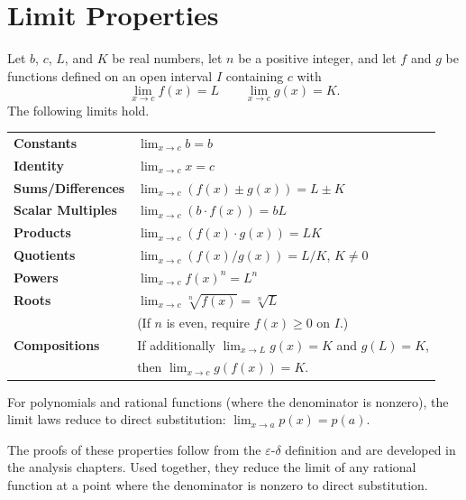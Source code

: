 \section{Limit Properties}

\begin{tcolorbox}[colback=thmbox, colframe=thmborder, arc=2pt,
  left=6pt, right=6pt, top=4pt, bottom=4pt,
  title={\small\textbf{Theorem (Basic Limit Properties)}},
  fonttitle=\small\bfseries]
Let $b$, $c$, $L$, and $K$ be real numbers, let $n$ be a positive
integer, and let $f$ and $g$ be functions defined on an open interval
$I$ containing $c$ with
\[
  \lim_{x \to c} f(x) = L \qquad \lim_{x \to c} g(x) = K.
\]
The following limits hold.

\medskip
\begin{tabular}{@{}p{}p{}@{}}
\textbf{Constants}        & $\displaystyle\lim_{x \to c} b = b$ \\[10pt]
\textbf{Identity}         & $\displaystyle\lim_{x \to c} x = c$ \\[10pt]
\textbf{Sums/Differences} & $\displaystyle\lim_{x \to c}(f(x) \pm g(x)) = L \pm K$ \\[10pt]
\textbf{Scalar Multiples} & $\displaystyle\lim_{x \to c}(b \cdot f(x)) = bL$ \\[10pt]
\textbf{Products}         & $\displaystyle\lim_{x \to c}(f(x) \cdot g(x)) = LK$ \\[10pt]
\textbf{Quotients}        & $\displaystyle\lim_{x \to c}(f(x)/g(x)) = L/K$, \quad $K \neq 0$ \\[10pt]
\textbf{Powers}           & $\displaystyle\lim_{x \to c} f(x)^n = L^n$ \\[10pt]
\textbf{Roots}            & $\displaystyle\lim_{x \to c} \sqrt[n]{f(x)} = \sqrt[n]{L}$ \\[4pt]
                          & (If $n$ is even, require $f(x) \geq 0$ on $I$.) \\[10pt]
\textbf{Compositions}     & If additionally $\displaystyle\lim_{x \to L} g(x) = K$ and $g(L) = K$, \\[6pt]
                          & then $\displaystyle\lim_{x \to c} g(f(x)) = K$. \\
\end{tabular}
\end{tcolorbox}

\begin{remark*}
For polynomials and rational functions (where the denominator is nonzero),
the limit laws reduce to direct substitution: $\lim_{x \to a} p(x) = p(a)$.
\end{remark*}

\begin{remark*}
The proofs of these properties follow from the $\varepsilon$-$\delta$
definition and are developed in the analysis chapters.
Used together, they reduce the limit of any rational function at a
point where the denominator is nonzero to direct substitution.
\end{remark*}